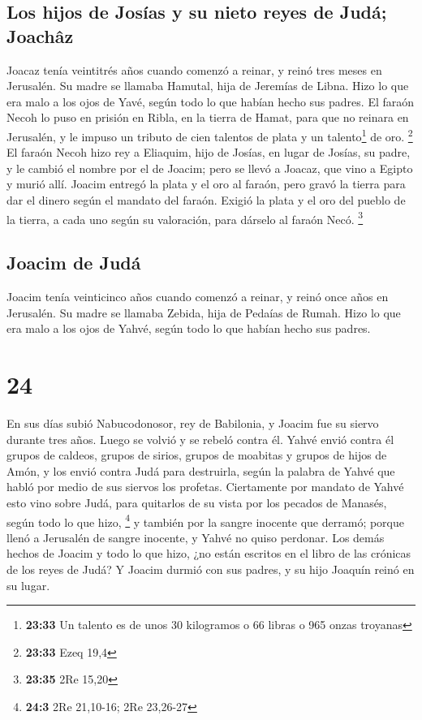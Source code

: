 \hypertarget{los-hijos-de-josuxedas-y-su-nieto-reyes-de-juduxe1-joachuxe2z}{%
\subsection{Los hijos de Josías y su nieto reyes de Judá;
Joachâz}\label{los-hijos-de-josuxedas-y-su-nieto-reyes-de-juduxe1-joachuxe2z}}

 Joacaz tenía veintitrés años cuando comenzó a reinar, y
reinó tres meses en Jerusalén. Su madre se llamaba Hamutal, hija de
Jeremías de Libna.  Hizo lo que era malo a los ojos de
Yavé, según todo lo que habían hecho sus padres.  El
faraón Necoh lo puso en prisión en Ribla, en la tierra de Hamat, para
que no reinara en Jerusalén, y le impuso un tributo de cien talentos de
plata y un talento\footnote{\textbf{23:33} Un talento es de unos 30
  kilogramos o 66 libras o 965 onzas troyanas} de oro. \footnote{\textbf{23:33}
  Ezeq 19,4}  El faraón Necoh hizo rey a Eliaquim, hijo
de Josías, en lugar de Josías, su padre, y le cambió el nombre por el de
Joacim; pero se llevó a Joacaz, que vino a Egipto y murió allí.
 Joacim entregó la plata y el oro al faraón, pero gravó
la tierra para dar el dinero según el mandato del faraón. Exigió la
plata y el oro del pueblo de la tierra, a cada uno según su valoración,
para dárselo al faraón Necó. \footnote{\textbf{23:35} 2Re 15,20}

\hypertarget{joacim-de-juduxe1}{%
\subsection{Joacim de Judá}\label{joacim-de-juduxe1}}

 Joacim tenía veinticinco años cuando comenzó a reinar, y
reinó once años en Jerusalén. Su madre se llamaba Zebida, hija de
Pedaías de Rumah.  Hizo lo que era malo a los ojos de
Yahvé, según todo lo que habían hecho sus padres.

\hypertarget{section-23}{%
\section{24}\label{section-23}}

 En sus días subió Nabucodonosor, rey de Babilonia, y
Joacim fue su siervo durante tres años. Luego se volvió y se rebeló
contra él.  Yahvé envió contra él grupos de caldeos,
grupos de sirios, grupos de moabitas y grupos de hijos de Amón, y los
envió contra Judá para destruirla, según la palabra de Yahvé que habló
por medio de sus siervos los profetas.  Ciertamente por
mandato de Yahvé esto vino sobre Judá, para quitarlos de su vista por
los pecados de Manasés, según todo lo que hizo, \footnote{\textbf{24:3}
  2Re 21,10-16; 2Re 23,26-27}  y también por la sangre
inocente que derramó; porque llenó a Jerusalén de sangre inocente, y
Yahvé no quiso perdonar.  Los demás hechos de Joacim y
todo lo que hizo, ¿no están escritos en el libro de las crónicas de los
reyes de Judá?  Y Joacim durmió con sus padres, y su hijo
Joaquín reinó en su lugar.


